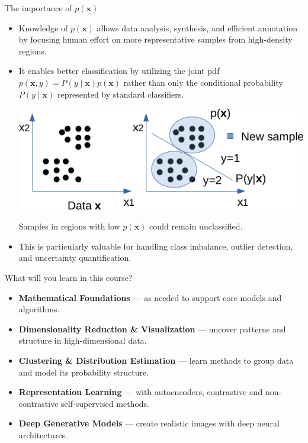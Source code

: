 \documentclass{beamer}
\begin{document}
\begin{frame}{The importance of $p(\mathbf{x})$}
  \begin{itemize}
  \item Knowledge of $p(\mathbf{x})$ allows data analysis, synthesis, and efficient
    annotation by focusing human effort on more representative samples from high-density regions.
\pause \vspace{0.3cm}    
  \item It enables better classification by utilizing the joint
    pdf $p(\mathbf{x},y) =
    P(y\mid\mathbf{x})p(\mathbf{x})$ rather than only the conditional
    probability $P(y\mid\mathbf{x})$ represented by standard classifiers.
\begin{center}  
\includegraphics[scale=0.45]{./figs/joint_distribution_classification.pdf}
\end{center}
Samples in regions with low $p(\textbf{x})$ could remain unclassified.
\pause \vspace{0.3cm}    
  \item This is particularly valuable for handling class imbalance,
    outlier detection, and uncertainty quantification.
  \end{itemize} 
\end{frame}
  
\begin{frame}{What will you learn in this course?}

\begin{itemize}
  \item \textbf{Mathematical Foundations} — as needed to support core models and algorithms.
  \vspace{0.3cm}
  \item \textbf{Dimensionality Reduction \& Visualization} — uncover patterns and structure in high-dimensional data.
  \vspace{0.3cm}
  \item \textbf{Clustering \& Distribution Estimation} — learn methods to group data and model its probability structure.
  \vspace{0.3cm}
  \item \textbf{Representation Learning} — with autoencoders, contrastive and non-contrastive self-supervised methods.
  \vspace{0.3cm}
  \item \textbf{Deep Generative Models} — create realistic images with deep neural architectures.
\end{itemize}

\end{frame}
  
\end{document}
